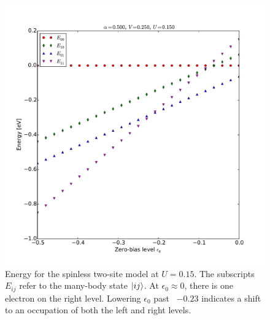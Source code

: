 \begin{figure}[!bt]
    \centering
    \includegraphics[height=.45\textheight]{pdf/energy/perrin_distribution_u2.pdf}
    \caption{Energy for the spinless two-site model at $U=0.15$. The subscripts $E_{ij}$ refer to the many-body state $\ket{i j}$. At $\epsilon_0 \approx 0$, there is one electron on the right level. Lowering $\epsilon_0$ past ~$-0.23$ indicates a shift to an occupation of both the left and right levels.  }
    \label{fig:perrinenergy2}
\end{figure}
